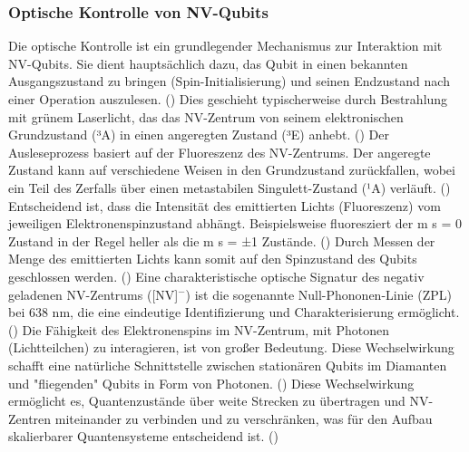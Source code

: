 \subsubsection{Optische Kontrolle von NV-Qubits}
Die optische Kontrolle ist ein grundlegender Mechanismus zur Interaktion mit NV-Qubits. Sie dient hauptsächlich dazu, das Qubit in einen bekannten Ausgangszustand zu bringen (Spin-Initialisierung) und seinen Endzustand nach einer Operation auszulesen. (\cite{StickstoffFehlstellenZentrum2025}) Dies geschieht typischerweise durch Bestrahlung mit grünem Laserlicht, das das NV-Zentrum von seinem elektronischen Grundzustand (³A) in einen angeregten Zustand (³E) anhebt. (\cite{StickstoffFehlstellenZentrum2025})
Der Ausleseprozess basiert auf der Fluoreszenz des NV-Zentrums. Der angeregte Zustand kann auf verschiedene Weisen in den Grundzustand zurückfallen, wobei ein Teil des Zerfalls über einen metastabilen Singulett-Zustand (¹A) verläuft. (\cite{StickstoffFehlstellenZentrum2025}) Entscheidend ist, dass die Intensität des emittierten Lichts (Fluoreszenz) vom jeweiligen Elektronenspinzustand abhängt. Beispielsweise fluoresziert der m s = 0 Zustand in der Regel heller als die m s = ±1 Zustände. (\cite{StickstoffFehlstellenZentrum2025}) Durch Messen der Menge des emittierten Lichts kann somit auf den Spinzustand des Qubits geschlossen werden. (\cite{StickstoffFehlstellenZentrum2025}) Eine charakteristische optische Signatur des negativ geladenen NV-Zentrums ([NV]$^{-}$) ist die sogenannte Null-Phononen-Linie (ZPL) bei 638 nm, die eine eindeutige Identifizierung und Charakterisierung ermöglicht. (\cite{StickstoffFehlstellenZentrum2025})
Die Fähigkeit des Elektronenspins im NV-Zentrum, mit Photonen (Lichtteilchen) zu interagieren, ist von großer Bedeutung. Diese Wechselwirkung schafft eine natürliche Schnittstelle zwischen stationären Qubits im Diamanten und "fliegenden" Qubits in Form von Photonen. (\cite{StickstoffFehlstellenZentrum2025}) Diese Wechselwirkung ermöglicht es, Quantenzustände über weite Strecken zu übertragen und NV-Zentren miteinander zu verbinden und zu verschränken, was für den Aufbau skalierbarer Quantensysteme entscheidend ist. (\cite{verstAufbauMessplatzesZur})
